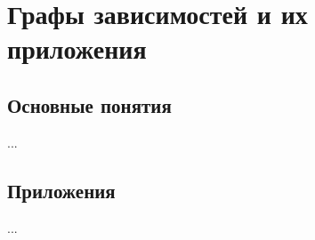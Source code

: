 
\chapter{Графы зависимостей и их приложения}

\section{Основные понятия}

...

\section{Приложения}

...
